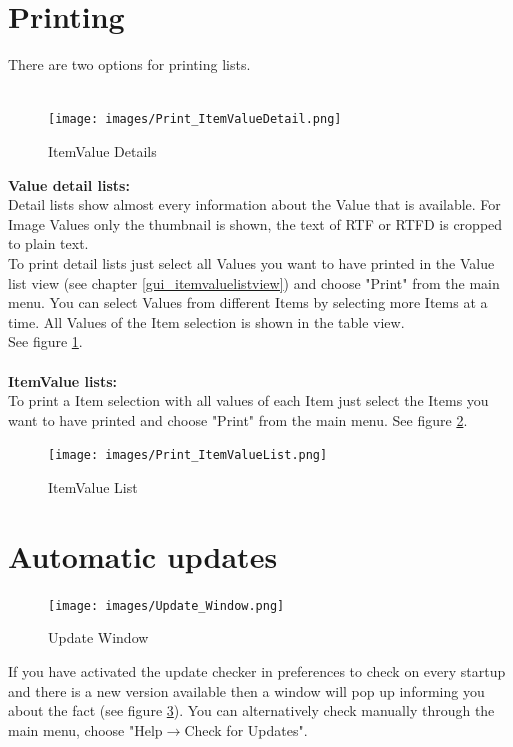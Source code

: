 \documentclass[12pt,a4]{article}
\begin{document}
\section{Printing}
\label{printing}
\medskip
There are two options for printing lists. \\
\\
% 
\begin{figure}[ht]
\begin{center}
\texttt{[image: images/Print\_ItemValueDetail.png]}
\end{center}
\caption{ItemValue Details}
\label{image:itemvalue_detail}
\end{figure}
\noindent
\textbf{Value detail lists:} \\
Detail lists show almost every information about the Value that is available. For Image Values only the thumbnail is shown, the text of RTF or RTFD is cropped to plain text. \\
To print detail lists just select all Values you want to have printed in the Value list view (see chapter \ref{gui_itemvaluelistview}) and choose "Print" from the main menu. You can select Values from different Items by selecting more Items at a time. All Values of the Item selection is shown in the table view. \\
See figure \ref{image:itemvalue_detail}. \\
\\
\textbf{ItemValue lists:} \\
To print a Item selection with all values of each Item just select the Items you want to have printed and choose "Print" from the main menu. See figure \ref{image:itemvalue_list}.
% 
\begin{figure}[ht]
\begin{center}
\texttt{[image: images/Print\_ItemValueList.png]}
\end{center}
\caption{ItemValue List}
\label{image:itemvalue_list}
\end{figure}
\noindent
\clearpage
\newpage
\section{Automatic updates}
\label{autoupdate}
\medskip
% 
\begin{figure}[ht]
\begin{center}
\texttt{[image: images/Update\_Window.png]}
\end{center}
\caption{Update Window}
\label{image:updates}
\end{figure}
\noindent
If you have activated the update checker in preferences to check on every startup and there is a new version available then a window will pop up informing you about the fact (see figure \ref{image:updates}). You can alternatively check manually through the main menu, choose "Help$\rightarrow$Check for Updates".
\newpage
\end{document}
